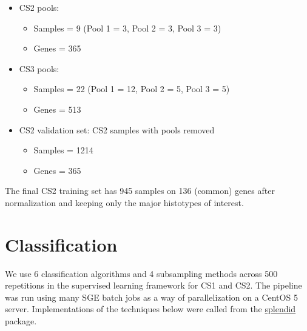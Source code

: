 \documentclass[
]{report}
\providecommand{\tightlist}{%
  \setlength{\itemsep}{0pt}\setlength{\parskip}{0pt}}
\begin{document}
\begin{itemize}
\tightlist
\item
  CS2 pools:

  \begin{itemize}
  \tightlist
  \item
    Samples = 9 (Pool 1 = 3, Pool 2 = 3, Pool 3 = 3)
  \item
    Genes = 365
  \end{itemize}
\item
  CS3 pools:

  \begin{itemize}
  \tightlist
  \item
    Samples = 22 (Pool 1 = 12, Pool 2 = 5, Pool 3 = 5)
  \item
    Genes = 513
  \end{itemize}
\item
  CS2 validation set: CS2 samples with pools removed

  \begin{itemize}
  \tightlist
  \item
    Samples = 1214
  \item
    Genes = 365
  \end{itemize}
\end{itemize}

The final CS2 training set has 945 samples on 136 (common) genes after normalization and keeping only the major histotypes of interest.

\hypertarget{classification}{%
\section{Classification}\label{classification}}

We use 6 classification algorithms and 4 subsampling methods across 500 repetitions in the supervised learning framework for CS1 and CS2. The pipeline was run using many SGE batch jobs as a way of parallelization on a CentOS 5 server. Implementations of the techniques below were called from the \href{https://alinetalhouk.github.io/splendid/}{splendid} package.
\end{document}
